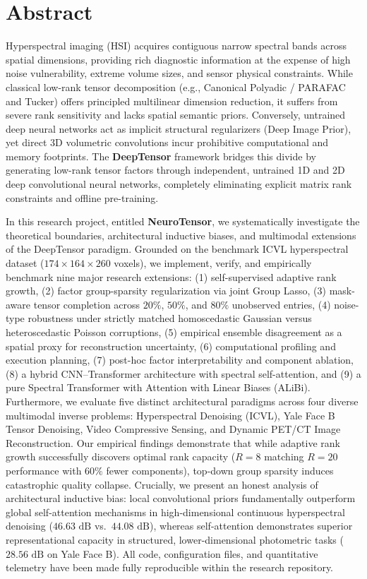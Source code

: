 \section*{Abstract}
{\small
Hyperspectral imaging (HSI) acquires contiguous narrow spectral bands across spatial dimensions, providing rich diagnostic information at the expense of high noise vulnerability, extreme volume sizes, and sensor physical constraints. While classical low-rank tensor decomposition (e.g., Canonical Polyadic / PARAFAC and Tucker) offers principled multilinear dimension reduction, it suffers from severe rank sensitivity and lacks spatial semantic priors. Conversely, untrained deep neural networks act as implicit structural regularizers (Deep Image Prior), yet direct 3D volumetric convolutions incur prohibitive computational and memory footprints. The \textbf{DeepTensor} framework bridges this divide by generating low-rank tensor factors through independent, untrained 1D and 2D deep convolutional neural networks, completely eliminating explicit matrix rank constraints and offline pre-training.

In this research project, entitled \textbf{NeuroTensor}, we systematically investigate the theoretical boundaries, architectural inductive biases, and multimodal extensions of the DeepTensor paradigm. Grounded on the benchmark ICVL hyperspectral dataset ($174 \times 164 \times 260$ voxels), we implement, verify, and empirically benchmark nine major research extensions: (1) self-supervised adaptive rank growth, (2) factor group-sparsity regularization via joint Group Lasso, (3) mask-aware tensor completion across $20\%$, $50\%$, and $80\%$ unobserved entries, (4) noise-type robustness under strictly matched homoscedastic Gaussian versus heteroscedastic Poisson corruptions, (5) empirical ensemble disagreement as a spatial proxy for reconstruction uncertainty, (6) computational profiling and execution planning, (7) post-hoc factor interpretability and component ablation, (8) a hybrid CNN--Transformer architecture with spectral self-attention, and (9) a pure Spectral Transformer with Attention with Linear Biases (ALiBi). Furthermore, we evaluate five distinct architectural paradigms across four diverse multimodal inverse problems: Hyperspectral Denoising (ICVL), Yale Face B Tensor Denoising, Video Compressive Sensing, and Dynamic PET/CT Image Reconstruction. Our empirical findings demonstrate that while adaptive rank growth successfully discovers optimal rank capacity ($R=8$ matching $R=20$ performance with $60\%$ fewer components), top-down group sparsity induces catastrophic quality collapse. Crucially, we present an honest analysis of architectural inductive bias: local convolutional priors fundamentally outperform global self-attention mechanisms in high-dimensional continuous hyperspectral denoising ($46.63\text{ dB}$ vs.\ $44.08\text{ dB}$), whereas self-attention demonstrates superior representational capacity in structured, lower-dimensional photometric tasks ($28.56\text{ dB}$ on Yale Face B). All code, configuration files, and quantitative telemetry have been made fully reproducible within the research repository.
}

